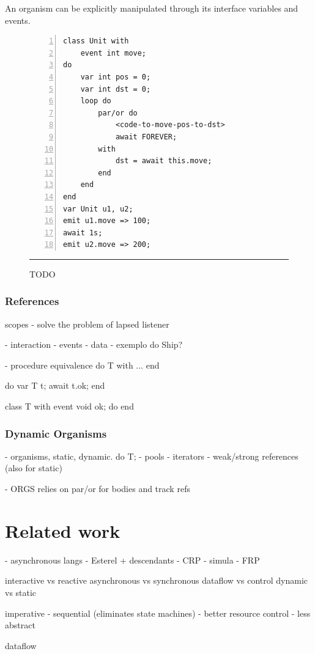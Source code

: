 \documentclass{acm_proc_article-sp}
\newcommand{\1}{\;}
\newcommand{\2}{\;\;}
\newcommand{\3}{\;\;\;}
\newcommand{\5}{\;\;\;\;\;}
\begin{document}
An organism can be explicitly manipulated through its interface variables and 
events.

\begin{figure}[t]
\begin{lstlisting}[numbers=left,xleftmargin=3em]
class Unit with
    event int move;
do
    var int pos = 0;
    var int dst = 0;
    loop do
        par/or do
            <code-to-move-pos-to-dst>
            await FOREVER;
        with
            dst = await this.move;
        end
    end
end
var Unit u1, u2;
emit u1.move => 100;
await 1s;
emit u2.move => 200;
\end{lstlisting}
\rule{8.5cm}{0.37pt}
\caption{ TODO }
\end{figure}

\subsubsection{References}

scopes
    - solve the problem of lapsed listener

- interaction
    - events
    - data
    - exemplo do Ship?

- procedure equivalence
    do T with
        ...
    end

    do
        var T t;
        await t.ok;
    end

    class T with
        event void ok;
    do
    end

\subsubsection{Dynamic Organisms}

- organisms, static, dynamic. do T;
- pools
- iterators
- weak/strong references (also for static)

- ORGS relies on par/or for bodies and track refs

\section{Related work}

- asynchronous langs
- Esterel + descendants
- CRP
- simula
- FRP

interactive  vs reactive
asynchronous vs synchronous
dataflow vs control
dynamic vs static

imperative
    - sequential (eliminates state machines)
    - better resource control
    - less abstract

dataflow
\end{document}
